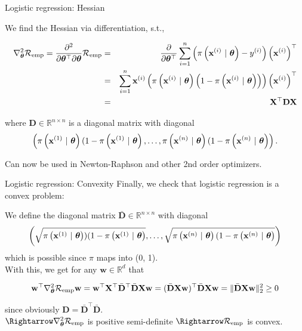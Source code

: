 \documentclass[11pt,compress,t,notes=noshow, xcolor=table]{beamer}
\begin{document}
\begin{vbframe}{Logistic regression: Hessian}

We find the Hessian via differentiation, s.t.,

\begin{align*}
  \nabla^2_{\thetab}\riske  = \frac{\partial^2}{\partial{\thetab^\top}\partial\thetab}\riske  & = & 
 \frac{\partial}{\partial{\thetab^\top}} \sumin \left(\pixit - \yi\right)\left(\xi\right)^\top\\
 & = & 
  \sum^n_{i=1}\xi \left(\pixit\left(1-\pixit\right)\right)\left(\xi\right)^\top\\
  & = & 
\mathbf{X}^\top \mathbf{D} \mathbf{X}\\
\end{align*}

where $\mathbf{D} \in \mathbb{R}^{n\times n}$ is a diagonal matrix with diagonal 
$$\left(\pixit[1](1-\pixit[1], \dots, \pixit[n](1-\pixit[n]\right).$$

Can now be used in Newton-Raphson and other 2nd order optimizers.


\end{vbframe}

\begin{vbframe}{Logistic regression: Convexity}
Finally, we check that logistic regression is a convex problem:
\vspace*{0.3cm}

We define the diagonal matrix $\bar{\mathbf{D}} \in \mathbb{R}^{n \times n}$ with diagonal 
$$\left(\sqrt{\pixit[1])(1-\pixit[1]}, \dots, \sqrt{\pixit[n](1-\pixit[n]}\right) $$
which is possible since $\pi$ maps into (0, 1). \\
\vspace*{0.3cm}
With this, we get for any $\mathbf{w} \in \mathbb{R}^d$ that

$$\mathbf{w}^\top  \nabla^2_{\thetab}\riske \mathbf{w} =   \mathbf{w}^\top  \mathbf{X}^\top \bar{\mathbf{D}}^\top \bar{\mathbf{D}}\mathbf{X} \mathbf{w} = (\bar{\mathbf{D}}\mathbf{X} \mathbf{w})^\top\bar{\mathbf{D}}\mathbf{X} \mathbf{w} = \Vert \bar{\mathbf{D}}\mathbf{X} \mathbf{w} \Vert^2_2 \geq 0$$

since obviously $\mathbf{D} = \bar{\mathbf{D}}^\top \bar{\mathbf{D}}.$ \\
\vspace*{0.3cm}
$\Rightarrow \nabla^2_{\thetab}\riske$ is positive semi-definite $\Rightarrow \riske$ is convex.

\end{vbframe}

\endlecture
\end{document}
